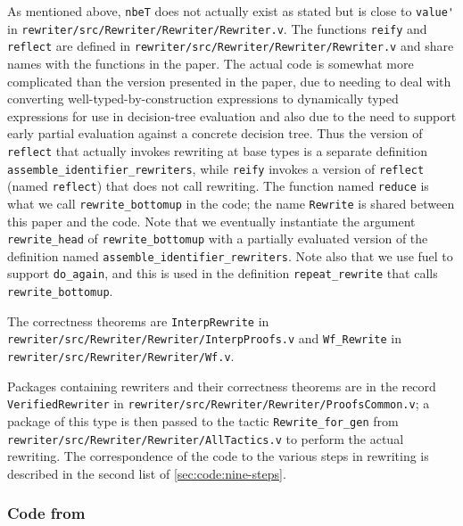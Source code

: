 \documentclass[sigplan,10pt,review,anonymous]{acmart}\settopmatter{printfolios=true,printccs=false,printacmref=false}
\begin{document}
As mentioned above, \verb|nbeT| does not actually exist as stated but is close to \verb|value'| in \texttt{rewriter/src/Rewriter/Rewriter/Rewriter.v}.
The functions \verb|reify| and \verb|reflect| are defined in \texttt{rewriter/src/Rewriter/Rewriter/Rewriter.v} and share names with the functions in the paper.
The actual code is somewhat more complicated than the version presented in the paper, due to needing to deal with converting well-typed-by-construction expressions to dynamically typed expressions for use in decision-tree evaluation and also due to the need to support early partial evaluation against a concrete decision tree.
Thus the version of \verb|reflect| that actually invokes rewriting at base types is a separate definition \verb|assemble_identifier_rewriters|, while \verb|reify| invokes a version of \verb|reflect| (named \verb|reflect|) that does not call rewriting.
The function named \texttt{reduce} is what we call \verb|rewrite_bottomup| in the code; the name \verb|Rewrite| is shared between this paper and the code.
Note that we eventually instantiate the argument \verb|rewrite_head| of \verb|rewrite_bottomup| with a partially evaluated version of the definition named \verb|assemble_identifier_rewriters|.
Note also that we use fuel to support \verb|do_again|, and this is used in the definition \verb|repeat_rewrite| that calls \verb|rewrite_bottomup|.

The correctness theorems are \verb|InterpRewrite| in \texttt{rewriter/src/Rewriter/Rewriter/InterpProofs.v} and \verb|Wf_Rewrite| in \texttt{rewriter/src/Rewriter/Rewriter/Wf.v}.

Packages containing rewriters and their correctness theorems are in the record \verb|VerifiedRewriter| in \texttt{rewriter/src/Rewriter/Rewriter/ProofsCommon.v};
a package of this type is then passed to the tactic \verb|Rewrite_for_gen| from \texttt{rewriter/src/Rewriter/Rewriter/AllTactics.v} to perform the actual rewriting.
The correspondence of the code to the various steps in rewriting is described in the second list of \autoref{sec:code:nine-steps}.

\subsubsection{Code from }
\end{document}
